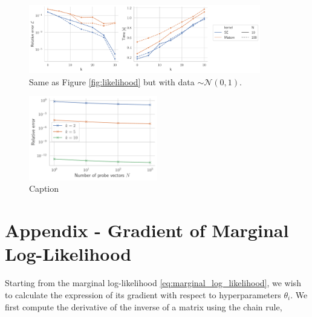 \documentclass{article}
\begin{document}
\begin{figure}
    \centering
    \includegraphics[width=0.9\textwidth]{report/res/likelihood_1d_stdnormal.pdf}
    \caption{Same as Figure \ref{fig:likelihood} but with data $\sim \mathcal N(0, 1)$.}
    \label{fig:likelihood_1d_stdnormal}
\end{figure}



\begin{figure}
    \centering
    \includegraphics[width=0.5\textwidth]{res/logdet_precond.pdf}
    \caption{Caption}
    \label{fig:logdet_precond}
\end{figure}




\newpage
\printbibliography


\newpage
\appendix
\appendixpage

\section{Appendix - Gradient of Marginal Log-Likelihood} \label{sec:marginal_log_likelihood_gradient}

Starting from the marginal log-likelihood \eqref{eq:marginal_log_likelihood}, we wish to calculate the expression of its gradient with respect to hyperparameters $\theta_i$. We first compute the derivative of the inverse of a matrix using the chain rule,
\end{document}
